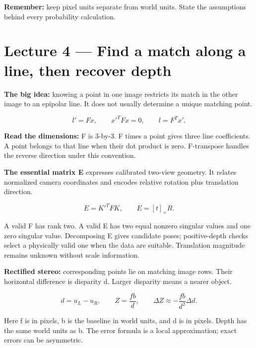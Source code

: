\documentclass[11pt,letterpaper]{article}
\begin{document}
\textbf{Remember:} keep pixel units separate from world units. State the assumptions behind every probability calculation.



\section*{Lecture 4 — Find a match along a line, then recover depth}


\textbf{The big idea:} knowing a point in one image restricts its match in the other image to an epipolar line. It does not usually determine a unique matching point.



\begin{tcolorbox}\color{MathBlue}\[l'=Fx,\qquad x'^TFx=0,\qquad l=F^Tx'.\]\end{tcolorbox}


\textbf{Read the dimensions:} F is 3-by-3. F times a point gives three line coefficients. A point belongs to that line when their dot product is zero. F-transpose handles the reverse direction under this convention.



\textbf{The essential matrix E} expresses calibrated two-view geometry. It relates normalized camera coordinates and encodes relative rotation plus translation direction.



\begin{tcolorbox}\color{MathBlue}\[E=K'^TFK,\qquad E=[t]_\times R.\]\end{tcolorbox}


A valid F has rank two. A valid E has two equal nonzero singular values and one zero singular value. Decomposing E gives candidate poses; positive-depth checks select a physically valid one when the data are suitable. Translation magnitude remains unknown without scale information.



\textbf{Rectified stereo:} corresponding points lie on matching image rows. Their horizontal difference is disparity d. Larger disparity means a nearer object.



\begin{tcolorbox}\color{MathBlue}\[d=u_L-u_R,\qquad Z=\frac{fb}{d},\qquad \Delta Z\approx-\frac{fb}{d^2}\Delta d.\]\end{tcolorbox}


Here f is in pixels, b is the baseline in world units, and d is in pixels. Depth has the same world units as b. The error formula is a local approximation; exact errors can be asymmetric.
\end{document}
